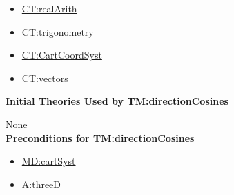 \documentclass[12pt]{article}
\begin{document}
\begin{itemize}
\item \hyperref[CT:realArith]{CT:realArith}
\item \hyperref[CT:trigonometry]{CT:trigonometry}
\item \hyperref[CT:CartCoordSyst]{CT:CartCoordSyst}
\item \hyperref[CT:vectors]{CT:vectors}
\end{itemize}

\noindent \textbf{Initial Theories Used by TM:directionCosines}

None
~\\

\noindent \textbf{Preconditions for TM:directionCosines}

\begin{itemize}
\item \hyperref[MD:cartSyst]{MD:cartSyst}
\item \hyperref[threeD]{A:threeD}
\end{itemize}
\end{document}
